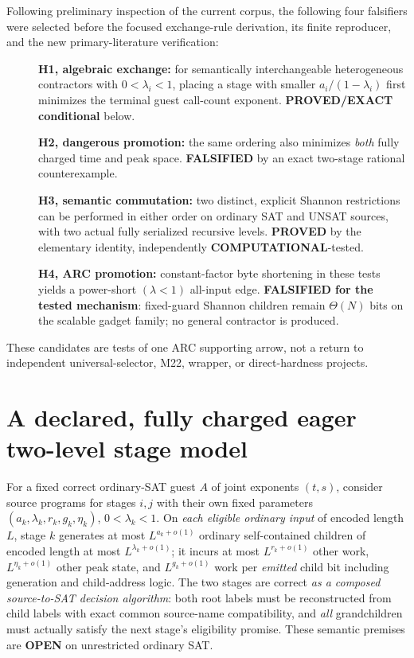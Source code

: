 \documentclass[11pt]{article}
\newcommand{\OPEN}{\textbf{OPEN}}
\begin{document}
Following preliminary inspection of the current corpus, the following four
falsifiers were selected before the focused exchange-rule derivation, its
finite reproducer, and the new primary-literature verification:
\begin{description}
\item[] \textbf{H1, algebraic exchange:} for semantically
interchangeable heterogeneous contractors with $0<\lambda_i<1$, placing a
stage with smaller $a_i/(1-\lambda_i)$ first minimizes the terminal guest
call-count exponent. \textbf{PROVED/EXACT conditional} below.
\item[] \textbf{H2, dangerous promotion:} the same ordering also minimizes
\emph{both} fully charged time and peak space. \textbf{FALSIFIED}
by an exact two-stage rational counterexample.
\item[] \textbf{H3, semantic commutation:} two distinct, explicit Shannon
restrictions can be performed in either order on ordinary SAT and UNSAT
sources, with two actual fully serialized recursive levels. \textbf{PROVED}
by the elementary identity, independently \textbf{COMPUTATIONAL}-tested.
\item[] \textbf{H4, ARC promotion:} constant-factor byte shortening in
these tests yields a power-short $(\lambda<1)$ all-input edge.
\textbf{FALSIFIED for the tested mechanism}: fixed-guard Shannon children
remain $\Theta(N)$ bits on the scalable gadget family; no general
contractor is produced.
\end{description}
These candidates are tests of one ARC supporting arrow, not a return to
independent universal-selector, M22, wrapper, or direct-hardness projects.

\section{A declared, fully charged eager two-level stage model}
For a fixed correct ordinary-SAT guest $A$ of joint exponents $(t,s)$,
consider source programs for stages $i,j$ with their own fixed parameters
$(a_k,\lambda_k,r_k,g_k,\eta_k)$, $0<\lambda_k<1$.
On \emph{each eligible ordinary input} of encoded length $L$, stage $k$
generates at most $L^{a_k+o(1)}$ ordinary self-contained children of
encoded length at most $L^{\lambda_k+o(1)}$; it incurs at most
$L^{r_k+o(1)}$ other work, $L^{\eta_k+o(1)}$ other peak state, and
$L^{g_k+o(1)}$ work per \emph{emitted} child bit including generation
and child-address logic. The two stages are correct \emph{as a composed
source-to-SAT decision algorithm}: both root labels must be reconstructed
from child labels with exact common source-name compatibility, and \emph{all}
grandchildren must actually satisfy the next stage's eligibility promise.
These semantic premises are \OPEN{} on unrestricted ordinary SAT.
\end{document}
